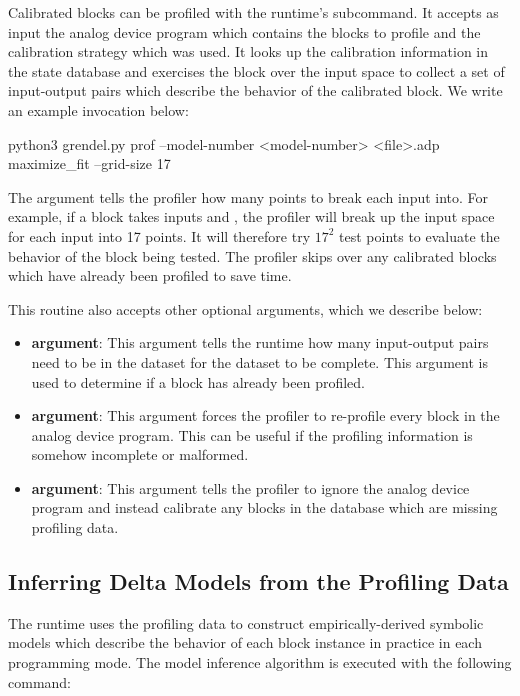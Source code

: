 Calibrated blocks can be profiled with the \grendel runtime's 
subcommand. It accepts as input the analog device program which contains the
blocks to profile and the calibration strategy which was used. It looks up the
calibration information in the state database and exercises the
block over the input space to collect a set of input-output pairs which describe
the behavior of the calibrated block. We write an example invocation below:

\begin{snippet}
 python3 grendel.py prof --model-number <model-number> <file>.adp maximize_fit
 --grid-size 17
\end{snippet}

The  argument tells the profiler how many points to break each
input into. For example, if a block takes inputs  and , the profiler
will break up the input space for each input into 17 points. It will therefore
try $17^2$ test points to evaluate the behavior of the block being tested. The
profiler skips over any calibrated blocks which have already been profiled to
save time.

This routine also accepts other optional arguments, which we describe below:

\begin{itemize}
\item\textbf{ argument}: This argument tells the runtime how
  many input-output pairs need to be in the dataset for the dataset to be
  complete. This argument is used to determine if a block has already been
  profiled.
  \item\textbf{ argument}: This argument forces the profiler to
    re-profile every block in the analog device program. This can be useful if
    the profiling information is somehow incomplete or malformed.
   \item\textbf{ argument}: This argument tells the profiler to
     ignore the analog device program and instead calibrate any blocks in the
     database which are missing profiling data.
\end{itemize}


\subsection{Inferring Delta Models from the Profiling Data}

The \grendel runtime uses the profiling data to construct empirically-derived
symbolic models which describe the behavior of each block instance in practice
in each programming mode. The model inference algorithm is executed with the
following command:

